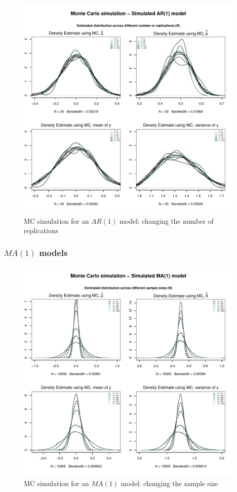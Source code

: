 \documentclass{article}
\begin{document}
\begin{figure}[hbt!]
\includegraphics[width=\textwidth]{plots/MC_AR1_densities_diff_norepl}
\caption{MC simulation for an $AR(1)$ model: changing the number of replications}
\label{fig:MC_AR1_densities_diff_norepl}
\centering
\end{figure}


\clearpage
\subsubsection{$MA(1)$ models}
\begin{figure}[hbt!]
\includegraphics[width=\textwidth]{plots/MC_MA1_densities_diff_smpl}
\caption{MC simulation for an $MA(1)$ model: changing the sample size}
\label{fig:MC_MA1_densities_diff_smpl}
\centering
\end{figure}
\end{document}
